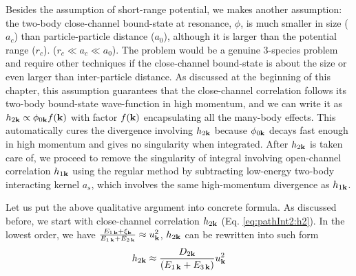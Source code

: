 Besides the assumption of short-range potential, we makes another assumption:  the  two-body close-channel bound-state at resonance, $\phi$, is much smaller in size ($a_{c}$) than particle-particle distance ($a_{0}$), although it is  larger than the potential range ($r_{c}$).     ($r_{c}\ll{}a_{c}\ll{}a_{0}$).  The problem would be a genuine 3-species problem and require other techniques if the close-channel bound-state is about the size  or even larger than  inter-particle distance. As discussed at the beginning of this chapter, this assumption guarantees that the close-channel correlation follows its two-body bound-state wave-function in high momentum, and  we can write it as $h_{2\mathbf{k}}\propto\phi_{0\mathbf{k}}f(\mathbf{k})$ with factor $f(\mathbf{k})$ encapsulating all the many-body effects. This automatically cures the divergence involving $h_{2\mathbf{k}}$ because $\phi_{0\mathbf{k}}$ decays fast enough in high momentum and gives no singularity when integrated.   After $h_{2\mathbf{k}}$ is taken care of, we proceed to remove the singularity of integral involving open-channel correlation $h_{1\mathbf{k}}$ using the regular method by subtracting low-energy two-body interacting kernel $a_{s}$, which involves  the same high-momentum divergence as $h_{1\mathbf{k}}$. 



Let us put the above qualitative argument into concrete formula.   As discussed before, we start with  close-channel correlation $h_{2\mathbf{k}}$ (Eq. \ref{eq:pathInt2:h2}). In the lowest order, we have $\frac{E_{1\,\mathbf{k}}+\xi_{\mathbf{k}}}{E_{1\,\mathbf{k}}+E_{2\,\mathbf{k}}}\approx{}u_{\mathbf{k}}^{2}$, $h_{2\mathbf{k}}$ can be rewritten into such form
\begin{equation}\label{eq:pathInt2:h2D2}
 h_{2\mathbf{k}}\approx\frac{D_{2\mathbf{k}}}{(E_{1\,\mathbf{k}}+E_{3\,\mathbf{k}})}u_{\mathbf{k}}^{2}
\end{equation}

 
